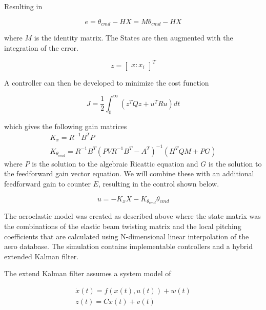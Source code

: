 \documentclass[11pt]{ucthesis}
\begin{document}
Resulting in

\begin{equation}
e = \theta_{cmd}-HX = M\theta_{cmd}-HX
\end{equation}

where $M$ is the identity matrix. The States are then augmented with the integration of the error.

\begin{equation}
z = \begin{bmatrix}
x:x_i\end{bmatrix}^T
\end{equation}

A controller can then be developed to minimize the cost function

\begin{equation}
J=\frac{1}{2}\int^{\infty}_0 (z^TQz+u^TRu)dt
\end{equation}

which gives the following gain matrices
\begin{equation}
\begin{matrix}
K_x = R^{-1}B^TP\\
K_{\theta_{cmd}} = R^{-1}B^T(PVR^{-1}B^T-A^T)^{-1}(H^TQM+PG)
\end{matrix}
\end{equation}
where $P$ is the solution to the algebraic Ricattic equation and $G$ is the solution to the feedforward gain vector equation. We will combine these with an additional feedforward gain to counter $E$, resulting in the control shown below.

\begin{equation}
u = -K_xX-K_{\theta_{cmd}}\theta_{cmd}
\end{equation}

The aeroelastic model was created as described above where the state matrix was the combinations of the elastic beam twisting matrix and the local pitching coefficients that are calculated using N-dimensional linear interpolation of the aero database. The simulation contains implementable controllers and a hybrid extended Kalman filter.

The extend Kalman filter assumes a system model of 

\begin{equation}
\begin{matrix}
\dot{x}(t) = f(x(t),u(t))+w(t)\\
z(t) = Cx(t)+v(t)
\end{matrix}
\end{equation}
\end{document}
